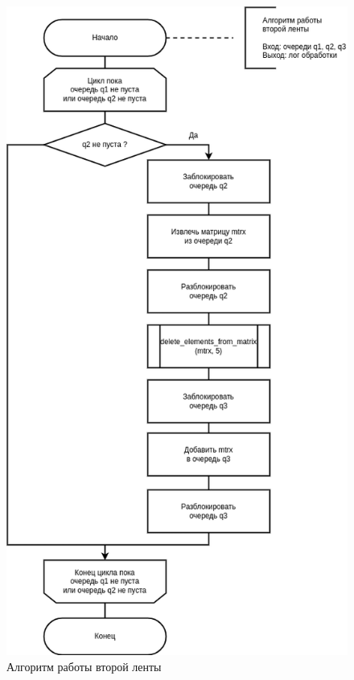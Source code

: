 \begin{figure}[H]
	\begin{center}
		\includegraphics[scale=0.63]{img/second.png}
	\end{center}
	\captionsetup{justification=centering}
	\caption{Алгоритм работы второй ленты}
	\label{img:second}
\end{figure}


